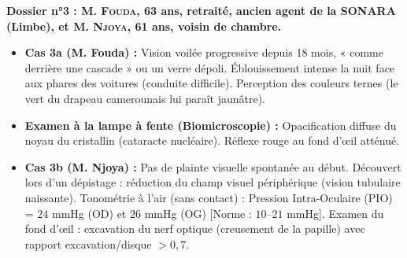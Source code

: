 \documentclass[11pt]{article}
\begin{document}
\vspace{0.3cm}
\noindent\textbf{Dossier n°3 : \textsc{M. Fouda}, 63 ans, retraité, ancien agent de la SONARA (Limbe), et \textsc{M. Njoya}, 61 ans, voisin de chambre.}
\begin{itemize}
    \item \textbf{Cas 3a (M. Fouda) :} Vision voilée progressive depuis 18 mois, « comme derrière une cascade » ou un verre dépoli. Éblouissement intense la nuit face aux phares des voitures (conduite difficile). Perception des couleurs ternes (le vert du drapeau camerounais lui paraît jaunâtre).
    \item \textbf{Examen à la lampe à fente (Biomicroscopie) :} Opacification diffuse du noyau du cristallin (cataracte nucléaire). Réflexe rouge au fond d'œil atténué.
    \item \textbf{Cas 3b (M. Njoya) :} Pas de plainte visuelle spontanée au début. Découvert lors d'un dépistage : réduction du champ visuel périphérique (vision tubulaire naissante). Tonométrie à l'air (sans contact) : Pression Intra-Oculaire (PIO) = $24$ mmHg (OD) et $26$ mmHg (OG) [Norme : $10$--$21$ mmHg]. Examen du fond d'œil : excavation du nerf optique (creusement de la papille) avec rapport excavation/disque $> 0,7$.
\end{itemize}
\end{document}
